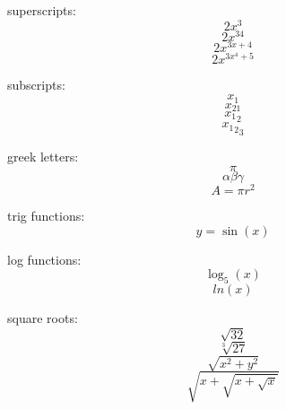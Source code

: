 \documentclass[11pt]{article}
\begin{document}
superscripts: 
$$2x^3$$
$$2x^{34}$$
$$2x^{3x+4}$$
$$2x^{3x^4+5}$$

subscripts:
$$x_1$$
$$x_{21}$$
$${x_1}_2$$
$${{x_1}_2}_3$$

greek letters:
$$\pi$$
$$\alpha \beta \gamma$$
$$A=\pi r^2$$

trig functions:
$$y=\sin(x)$$

log functions:
$$\log_5(x)$$
$$ln(x)$$

square roots:
$$\sqrt{32}$$
$$\sqrt[3]{27}$$
$$\sqrt{x^2+y^2}$$
$$\sqrt{x+\sqrt{x+\sqrt{x}}}$$
\end{document}
